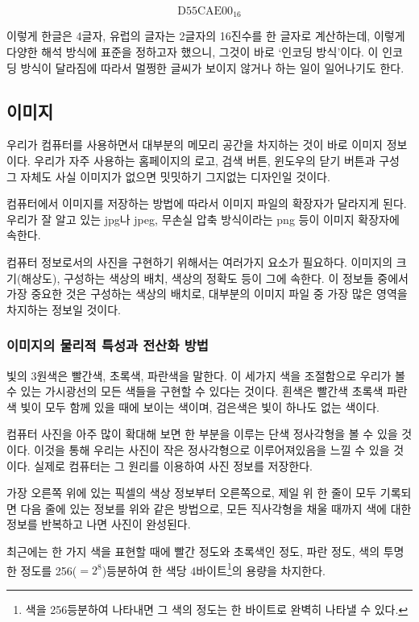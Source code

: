 \documentclass{article}
\begin{document}
$$
\text{D55CAE00}_{16}
$$

이렇게 한글은 4글자, 유럽의 글자는 2글자의 16진수를 한 글자로 계산하는데, 이렇게 다양한
해석 방식에 표준을 정하고자 했으니, 그것이 바로 `인코딩 방식'이다. 이 인코딩 방식이 달라짐에
따라서 멀쩡한 글씨가 보이지 않거나 하는 일이 일어나기도 한다.

\subsection{이미지}

우리가 컴퓨터를 사용하면서 대부분의 메모리 공간을 차지하는 것이 바로 이미지 정보이다.
우리가 자주 사용하는 홈페이지의 로고, 검색 버튼, 윈도우의 닫기 버튼과 구성 그 자체도
사실 이미지가 없으면 밋밋하기 그지없는 디자인일 것이다.

컴퓨터에서 이미지를 저장하는 방법에 따라서 이미지 파일의 확장자가 달라지게 된다.
우리가 잘 알고 있는 jpg나 jpeg, 무손실 압축 방식이라는 png 등이 이미지 확장자에 속한다.

컴퓨터 정보로서의 사진을 구현하기 위해서는 여러가지 요소가 필요하다.
이미지의 크기(해상도), 구성하는 색상의 배치, 색상의 정확도 등이 그에 속한다.
이 정보들 중에서 가장 중요한 것은 구성하는 색상의 배치로,
대부분의 이미지 파일 중 가장 많은 영역을 차지하는 정보일 것이다.

\subsubsection{이미지의 물리적 특성과 전산화 방법}

빛의 3원색은 빨간색, 초록색, 파란색을 말한다. 이 세가지 색을 조절함으로 우리가 볼 수 있는
가시광선의 모든 색들을 구현할 수 있다는 것이다. 흰색은 빨간색 초록색 파란색 빛이 모두 함께 있을 때에
보이는 색이며, 검은색은 빛이 하나도 없는 색이다.

컴퓨터 사진을 아주 많이 확대해 보면 한 부분을 이루는 단색 정사각형을 볼 수 있을 것이다.
이것을 통해 우리는 사진이 작은 정사각형으로 이루어져있음을 느낄 수 있을 것이다.
실제로 컴퓨터는 그 원리를 이용하여 사진 정보를 저장한다.

가장 오른쪽 위에 있는 픽셀의 색상 정보부터 오른쪽으로,
제일 위 한 줄이 모두 기록되면 다음 줄에 있는 정보를 위와 같은 방법으로,
모든 직사각형을 채울 때까지 색에 대한 정보를 반복하고 나면 사진이 완성된다.

최근에는 한 가지 색을 표현할 때에 빨간 정도와 초록색인 정도, 파란 정도, 색의 투명한 정도를
256($=2^8$)등분하여 한 색당 4바이트\footnote{색을 256등분하여 나타내면 그 색의 정도는 한
바이트로 완벽히 나타낼 수 있다.}의 용량을 차지한다.
\end{document}
